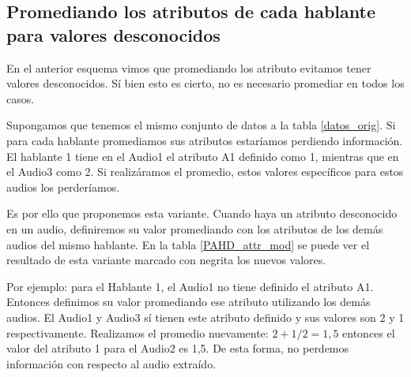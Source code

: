\subsection{Promediando los atributos de cada hablante para valores desconocidos}
\label{prom_los_atributos_de_cada_hablante_para_valores_desconocidos}

En el anterior esquema vimos que promediando los atributo evitamos tener valores desconocidos. Sí bien esto es cierto, no es necesario promediar en todos los casos. 

Supongamos que tenemos el mismo conjunto de datos a la tabla \ref{datos_orig}. Si para cada hablante promediamos sus atributos estaríamos perdiendo información. El hablante 1 tiene en el Audio1 el atributo A1 definido como 1, mientras que en el Audio3 como 2. Si realizáramos el promedio, estos valores específicos para estos audios los perderíamos.


Es por ello que proponemos esta variante. Cuando haya un atributo desconocido en un audio, definiremos su valor promediando con los atributos de los demás audios del mismo hablante. En la tabla \ref{PAHD_attr_mod} se puede ver el resultado de esta variante marcado con negrita los nuevos valores. 

Por ejemplo: para el Hablante 1, el Audio1 no tiene definido el atributo A1. Entonces definimos su valor promediando ese atributo utilizando los demás audios. El Audio1 y Audio3 sí tienen este atributo definido y sus valores son 2 y 1 respectivamente. Realizamos el promedio nuevamente: $ 2 + 1 / 2 = 1,5$ entonces el valor del atributo 1 para el Audio2 es 1,5. De esta forma, no perdemos información con respecto al audio extraído.

